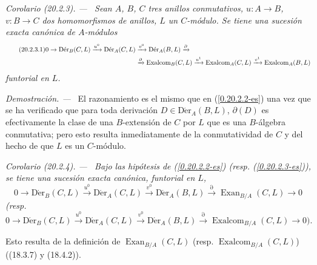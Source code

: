 \documentclass[10pt,oneside]{book}
\makeatletter
\newcommand{\sref}[1]{\textup{(\ref{#1})}}
\newcommand{\setmanualcurrentlabel}[1]{\def\@currentlabel{#1}}
\newcommand{\oldpage}[2][]{%
  \setcounter{footnote}{0}%
  \marginpar{\scriptsize\textbf{#1}~|~#2}\ignorespaces}
\newenvironment{corollary}[1][]{%
  \setmanualcurrentlabel{#1}\par\medskip\noindent\itshape Corolario (#1). ---\ }{\par}
\newenvironment{proof}{%
  \par\medskip\noindent\textit{Demostración. ---\ }}{\par}
\makeatother
\begin{document}
\oldpage[0\textsubscript{IV-1}]{121}
\begin{corollary}[20.2.3]
\label{0.20.2.3-es}
Sean $A$, $B$, $C$ tres anillos conmutativos, $u:A\to B$, $v:B\to C$
dos homomorfismos de anillos, $L$ un $C$-módulo. Se tiene una sucesión exacta
canónica de $A$-módulos
\begin{align}
\tag{20.2.3.1}
\label{0.20.2.3.1-es}
  0\to\operatorname{D\acute{e}r}_B(C,L)\xrightarrow{u^0}
  \operatorname{D\acute{e}r}_A(C,L)&\xrightarrow{v^0}
  \operatorname{D\acute{e}r}_A(B,L)\xrightarrow{\partial} \\
  &\xrightarrow{\partial}\operatorname{Exalcom}_B(C,L)\xrightarrow{u^1}
  \operatorname{Exalcom}_A(C,L)\xrightarrow{v^1}
  \operatorname{Exalcom}_A(B,L) \notag
\end{align}
funtorial en $L$.
\end{corollary}

\begin{proof}
El razonamiento es el mismo que en \sref{0.20.2.2-es} una vez que se ha
verificado que para toda derivación $D\in\operatorname{D\acute{e}r}_A(B,L)$,
$\partial(D)$ es efectivamente la clase de una $B$-extensión de $C$ por $L$ que es
una $B$-álgebra conmutativa; pero esto resulta inmediatamente de la conmutatividad
de $C$ y del hecho de que $L$ es un $C$-módulo.
\end{proof}

\begin{corollary}[20.2.4]
\label{0.20.2.4-es}
Bajo las hipótesis de \sref{0.20.2.2-es} \textup{(resp.}
\sref{0.20.2.3-es}), se tiene una sucesión exacta canónica, funtorial en $L$,
\begin{equation}
\tag{20.2.4.1}
\label{0.20.2.4.1-es}
  0\to\operatorname{D\acute{e}r}_B(C,L)\xrightarrow{u^0}
  \operatorname{D\acute{e}r}_A(C,L)\xrightarrow{v^0}
  \operatorname{D\acute{e}r}_A(B,L)\xrightarrow{\partial}
  \operatorname{Exan}_{B/A}(C,L)\to0
\end{equation}
\textup{(resp.}
\begin{equation}
\tag{20.2.4.2}
\label{0.20.2.4.2-es}
  0\to\operatorname{D\acute{e}r}_B(C,L)\xrightarrow{u^0}
  \operatorname{D\acute{e}r}_A(C,L)\xrightarrow{v^0}
  \operatorname{D\acute{e}r}_A(B,L)\xrightarrow{\partial}
  \operatorname{Exalcom}_{B/A}(C,L)\to0\text{).}
\end{equation}
\end{corollary}
\noindent Esto resulta de la definición de $\operatorname{Exan}_{B/A}(C,L)$ (resp.
$\operatorname{Exalcom}_{B/A}(C,L)$) ((18.3.7) y (18.4.2)).
\end{document}
